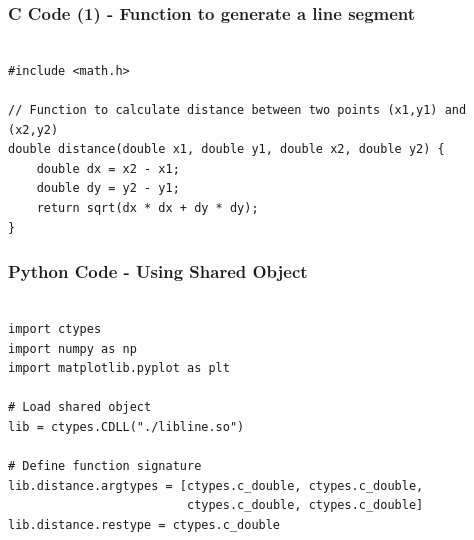 \documentclass{beamer}
\begin{document}
\begin{frame}[fragile]
    \frametitle{C Code (1) - Function to generate a line segment }

    \begin{lstlisting}

#include <math.h>

// Function to calculate distance between two points (x1,y1) and (x2,y2)
double distance(double x1, double y1, double x2, double y2) {
    double dx = x2 - x1;
    double dy = y2 - y1;
    return sqrt(dx * dx + dy * dy);
}

    \end{lstlisting}
\end{frame}


\begin{frame}[fragile]
    \frametitle{Python Code - Using Shared Object}
    \begin{lstlisting}

import ctypes
import numpy as np
import matplotlib.pyplot as plt

# Load shared object
lib = ctypes.CDLL("./libline.so")

# Define function signature
lib.distance.argtypes = [ctypes.c_double, ctypes.c_double,
                         ctypes.c_double, ctypes.c_double]
lib.distance.restype = ctypes.c_double


   



\end{lstlisting}
\end{frame}
\end{document}
